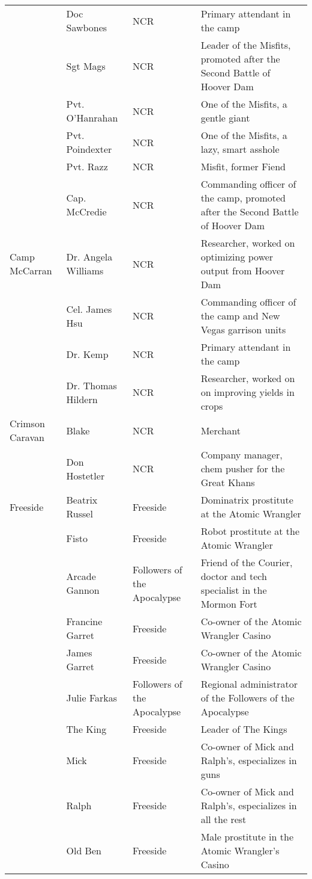 \begin{longtable}{|p{3cm}|p{3cm}|p{3cm}|p{6cm}|}
\hfill & Doc Sawbones & NCR & Primary attendant in the camp \\
\hfill & Sgt Mags & NCR & Leader of the Misfits, promoted after the Second Battle of Hoover Dam \\
\hfill & Pvt. O'Hanrahan & NCR & One of the Misfits, a gentle giant \\
\hfill & Pvt. Poindexter & NCR & One of the Misfits, a lazy, smart asshole \\
\hfill & Pvt. Razz & NCR & Misfit, former Fiend \\
\hfill & Cap. McCredie & NCR & Commanding officer of the camp, promoted after the Second Battle of Hoover Dam \\
Camp McCarran & Dr. Angela Williams & NCR & Researcher, worked on optimizing power output from Hoover Dam  \\
\hfill & Cel. James Hsu & NCR & Commanding officer of the camp and New Vegas garrison units \\
\hfill & Dr. Kemp & NCR & Primary attendant in the camp \\
\hfill & Dr. Thomas Hildern & NCR & Researcher, worked on on improving yields in crops \\
Crimson Caravan & Blake & NCR & Merchant \\
\hfill & Don Hostetler & NCR & Company manager, chem pusher for the Great Khans \\
Freeside & Beatrix Russel & Freeside & Dominatrix prostitute at the Atomic Wrangler \\
\hfill & Fisto & Freeside & Robot prostitute at the Atomic Wrangler \\
\hfill & Arcade Gannon & Followers of the Apocalypse & Friend of the Courier, doctor and tech specialist in the Mormon Fort \\
\hfill & Francine Garret & Freeside & Co-owner of the Atomic Wrangler Casino \\
\hfill & James Garret & Freeside & Co-owner of the Atomic Wrangler Casino \\
\hfill & Julie Farkas & Followers of the Apocalypse & Regional administrator of the Followers of the Apocalypse \\
\hfill & The King & Freeside & Leader of The Kings \\
\hfill & Mick & Freeside & Co-owner of Mick and Ralph's, especializes in guns \\
\hfill & Ralph & Freeside & Co-owner of Mick and Ralph's, especializes in all the rest \\
\hfill & Old Ben & Freeside & Male prostitute in the Atomic Wrangler's Casino \\

\end{longtable}
